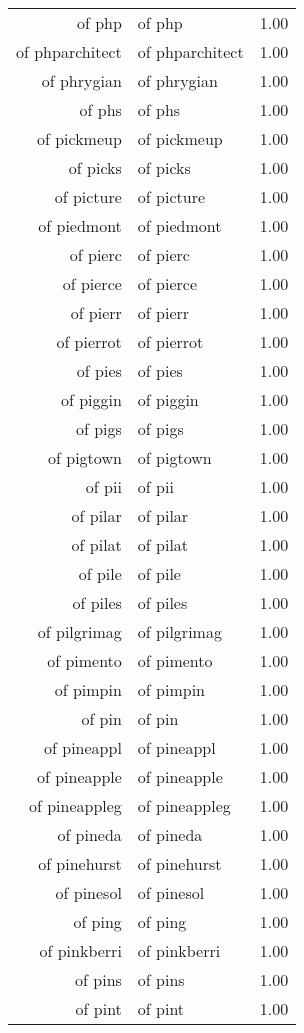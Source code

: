 \begin{table}[ht]
\begin{tabular}{rlr}
  of php & of php & 1.00 \\ 
  of phparchitect & of phparchitect & 1.00 \\ 
  of phrygian & of phrygian & 1.00 \\ 
  of phs & of phs & 1.00 \\ 
  of pickmeup & of pickmeup & 1.00 \\ 
  of picks & of picks & 1.00 \\ 
  of picture & of picture & 1.00 \\ 
  of piedmont & of piedmont & 1.00 \\ 
  of pierc & of pierc & 1.00 \\ 
  of pierce & of pierce & 1.00 \\ 
  of pierr & of pierr & 1.00 \\ 
  of pierrot & of pierrot & 1.00 \\ 
  of pies & of pies & 1.00 \\ 
  of piggin & of piggin & 1.00 \\ 
  of pigs & of pigs & 1.00 \\ 
  of pigtown & of pigtown & 1.00 \\ 
  of pii & of pii & 1.00 \\ 
  of pilar & of pilar & 1.00 \\ 
  of pilat & of pilat & 1.00 \\ 
  of pile & of pile & 1.00 \\ 
  of piles & of piles & 1.00 \\ 
  of pilgrimag & of pilgrimag & 1.00 \\ 
  of pimento & of pimento & 1.00 \\ 
  of pimpin & of pimpin & 1.00 \\ 
  of pin & of pin & 1.00 \\ 
  of pineappl & of pineappl & 1.00 \\ 
  of pineapple & of pineapple & 1.00 \\ 
  of pineappleg & of pineappleg & 1.00 \\ 
  of pineda & of pineda & 1.00 \\ 
  of pinehurst & of pinehurst & 1.00 \\ 
  of pinesol & of pinesol & 1.00 \\ 
  of ping & of ping & 1.00 \\ 
  of pinkberri & of pinkberri & 1.00 \\ 
  of pins & of pins & 1.00 \\ 
  of pint & of pint & 1.00 \\ 

\end{tabular}
\end{table}

